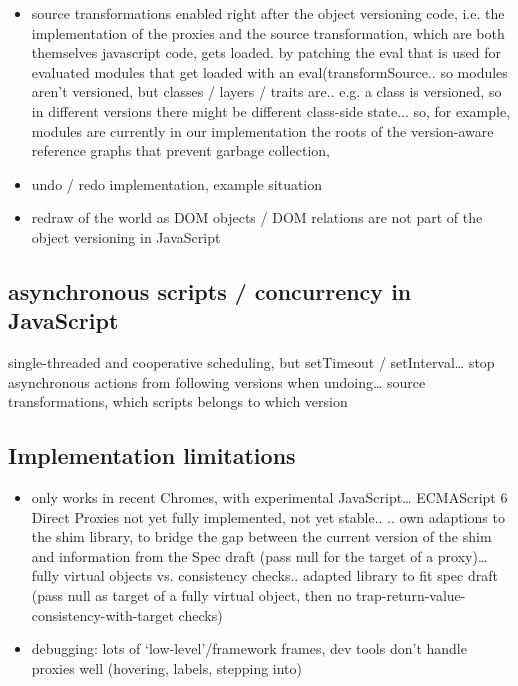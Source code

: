 \begin{itemize}
    \item source transformations enabled right after the object versioning code, i.e. the implementation of the proxies and the source transformation, which are both themselves javascript code, gets loaded. by patching the eval that is used for evaluated modules that get loaded with an eval(transformSource.. so modules aren’t versioned, but classes / layers / traits are.. e.g. a class is versioned, so in different versions there might be different class-side state... so, for example, modules are currently in our implementation the roots of the version-aware reference graphs that prevent garbage collection, 
\end{itemize}


\begin{itemize}
    \item undo / redo implementation, example situation
    \item redraw of the world as DOM objects / DOM relations are not part of the object versioning in JavaScript
\end{itemize}




\subsection{asynchronous scripts / concurrency in JavaScript}

single-threaded and cooperative scheduling, but setTimeout / setInterval… stop asynchronous actions from following versions when undoing… source transformations, which scripts belongs to which version




\subsection{Implementation limitations}

\begin{itemize}
    \item only works in recent Chromes, with experimental JavaScript… ECMAScript 6 Direct Proxies not yet fully implemented, not yet stable.. 
.. own adaptions to the shim library, to bridge the gap between the current version of the shim and information from the Spec draft (pass null for the target of a proxy)… fully virtual objects vs. consistency checks.. adapted library to fit spec draft (pass null as target of a fully virtual object, then no trap-return-value-consistency-with-target checks)
\end{itemize}
    


\begin{itemize}
    \item debugging: lots of ‘low-level’/framework frames, dev tools don’t handle proxies well (hovering, labels, stepping into)
\end{itemize}
